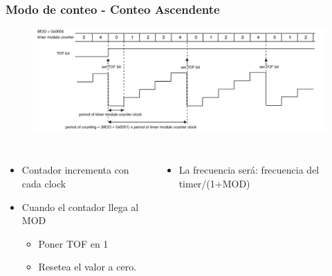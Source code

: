 \documentclass[10.5pt,scale=1.0,t,aspectratio=169,hyperref={pdfpagelabels=false}]{beamer}
\begin{document}
\begin{frame}
	\frametitle{Modo de conteo - Conteo Ascendente}
	\vspace{-0.3cm}
	{\footnotesize
		\begin{figure}
			\centering
			\includegraphics[scale=0.65]{07_CountingUp}
		\end{figure}
		
		\begin{columns}
			\begin{itemize}
				\item Contador incrementa con cada clock
				\item Cuando el contador llega al MOD
				\begin{itemize}
					\item Poner TOF en 1
					\item Resetea el valor a cero.
				\end{itemize}
			\end{itemize}
			
			\begin{itemize}
				\item La frecuencia será: frecuencia del timer/(1+MOD)
			\end{itemize}
		
		\end{columns}
	}
\end{frame}
\end{document}

